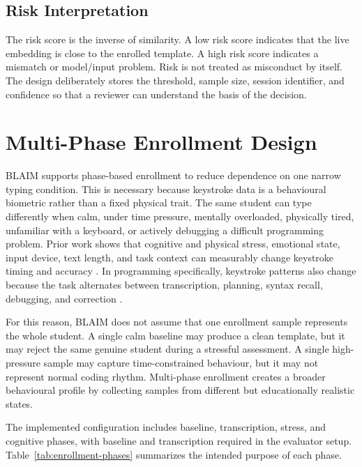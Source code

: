 \subsection{Risk Interpretation}
\label{subsec:risk-interpretation}

The risk score is the inverse of similarity. A low risk score indicates that the live embedding is close to the enrolled template. A high risk score indicates a mismatch or model/input problem. Risk is not treated as misconduct by itself. The design deliberately stores the threshold, sample size, session identifier, and confidence so that a reviewer can understand the basis of the decision.

\section{Multi-Phase Enrollment Design}
\label{sec:multi-phase-enrollment}

BLAIM supports phase-based enrollment to reduce dependence on one narrow typing condition. This is necessary because keystroke data is a behavioural biometric rather than a fixed physical trait. The same student can type differently when calm, under time pressure, mentally overloaded, physically tired, unfamiliar with a keyboard, or actively debugging a difficult programming problem. Prior work shows that cognitive and physical stress, emotional state, input device, text length, and task context can measurably change keystroke timing and accuracy \cite{vizer2009stress,epp2011emotional,lee2014emotion,kang2015inputdevices,macdonald2026stress}. In programming specifically, keystroke patterns also change because the task alternates between transcription, planning, syntax recall, debugging, and correction \cite{edwards2020keystroke}.

For this reason, BLAIM does not assume that one enrollment sample represents the whole student. A single calm baseline may produce a clean template, but it may reject the same genuine student during a stressful assessment. A single high-pressure sample may capture time-constrained behaviour, but it may not represent normal coding rhythm. Multi-phase enrollment creates a broader behavioural profile by collecting samples from different but educationally realistic states.

The implemented configuration includes baseline, transcription, stress, and cognitive phases, with baseline and transcription required in the evaluator setup. Table~\ref{tab:enrollment-phases} summarizes the intended purpose of each phase.

